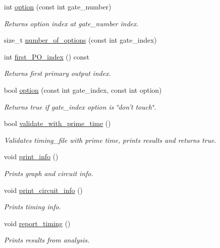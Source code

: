 \begin{DoxyCompactItemize}
int \hyperlink{classTiming__Analysis_1_1Timing__Analysis_a578a7940a493f7e6ab5ca4518984b8d4}{option} (const int gate\-\_\-number)
\begin{DoxyCompactList}\small\item\em Returns option index at gate\-\_\-number index. \end{DoxyCompactList}\item 
size\-\_\-t \hyperlink{classTiming__Analysis_1_1Timing__Analysis_a392a426d13c3d2258e07c553039af878}{number\-\_\-of\-\_\-options} (const int gate\-\_\-index)
\item 
int \hyperlink{classTiming__Analysis_1_1Timing__Analysis_a5c2fd4b82fa80ea43fa1f519b230c8fe}{first\-\_\-\-P\-O\-\_\-index} () const 
\begin{DoxyCompactList}\small\item\em Returns first primary output index. \end{DoxyCompactList}\item 
bool \hyperlink{classTiming__Analysis_1_1Timing__Analysis_ad5d0274622ee3f7d2c2f3d731b35ac9a}{option} (const int gate\-\_\-index, const int option)
\begin{DoxyCompactList}\small\item\em Returns true if gate\-\_\-index option is \char`\"{}don't touch\char`\"{}. \end{DoxyCompactList}\item 
bool \hyperlink{classTiming__Analysis_1_1Timing__Analysis_aa4220574cd239b38b7905636a6a4e43b}{validate\-\_\-with\-\_\-prime\-\_\-time} ()
\begin{DoxyCompactList}\small\item\em Validates timing\-\_\-file with prime time, prints results and returns true. \end{DoxyCompactList}\item 
void \hyperlink{classTiming__Analysis_1_1Timing__Analysis_ad88fd0b79ae6d221a5691da10b0aa9e4}{print\-\_\-info} ()
\begin{DoxyCompactList}\small\item\em Prints graph and circuit info. \end{DoxyCompactList}\item 
void \hyperlink{classTiming__Analysis_1_1Timing__Analysis_a2c45b5a9fd71b7197a327593d54663a3}{print\-\_\-circuit\-\_\-info} ()
\begin{DoxyCompactList}\small\item\em Prints timing info. \end{DoxyCompactList}\item 
void \hyperlink{classTiming__Analysis_1_1Timing__Analysis_a6d3fd296c18a72b05d36addc14068e16}{report\-\_\-timing} ()
\begin{DoxyCompactList}\small\item\em Prints results from analysis. \end{DoxyCompactList}\end{DoxyCompactItemize}


